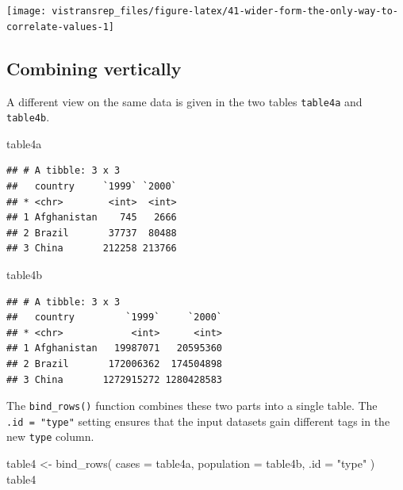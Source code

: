\documentclass[]{book}
\newenvironment{Shaded}{}{}
\newcommand{\DataTypeTok}[1]{#1}
\newcommand{\KeywordTok}[1]{\textcolor[rgb]{0.00,0.00,1.00}{#1}}
\newcommand{\NormalTok}[1]{#1}
\newcommand{\StringTok}[1]{\textcolor[rgb]{0.00,0.50,0.50}{#1}}
\begin{document}
\begin{flushright}\texttt{[image: vistransrep\_files/figure-latex/41-wider-form-the-only-way-to-correlate-values-1]} \end{flushright}

\hypertarget{combining-vertically}{%
\subsection{Combining vertically}\label{combining-vertically}}

A different view on the same data is given in the two tables \texttt{table4a} and \texttt{table4b}.

\begin{Shaded}
\begin{Highlighting}[]
\NormalTok{table4a}
\end{Highlighting}
\end{Shaded}

\begin{verbatim}
## # A tibble: 3 x 3
##   country     `1999` `2000`
## * <chr>        <int>  <int>
## 1 Afghanistan    745   2666
## 2 Brazil       37737  80488
## 3 China       212258 213766
\end{verbatim}

\begin{Shaded}
\begin{Highlighting}[]
\NormalTok{table4b}
\end{Highlighting}
\end{Shaded}

\begin{verbatim}
## # A tibble: 3 x 3
##   country         `1999`     `2000`
## * <chr>            <int>      <int>
## 1 Afghanistan   19987071   20595360
## 2 Brazil       172006362  174504898
## 3 China       1272915272 1280428583
\end{verbatim}

The \texttt{bind\_rows()} function combines these two parts into a single table.
The \texttt{.id\ =\ "type"} setting ensures that the input datasets gain different tags in the new \texttt{type} column.

\begin{Shaded}
\begin{Highlighting}[]
\NormalTok{table4 <-}
\StringTok{  }\KeywordTok{bind_rows}\NormalTok{(}
    \DataTypeTok{cases =}\NormalTok{ table4a,}
    \DataTypeTok{population =}\NormalTok{ table4b,}
    \DataTypeTok{.id =} \StringTok{"type"}
\NormalTok{  )}
\NormalTok{table4}
\end{Highlighting}
\end{Shaded}
\end{document}
